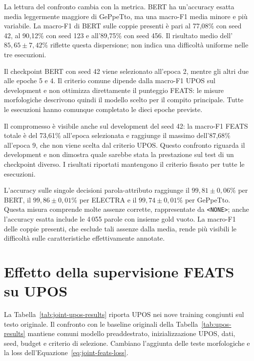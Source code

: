 \documentclass[12pt,a4paper]{report}
\begin{document}
La lettura del confronto cambia con la metrica. BERT ha un'accuracy esatta media leggermente maggiore di GePpeTto, ma una macro-F1 media minore e più variabile. La macro-F1 di BERT sulle coppie presenti è pari al 77,08\% con seed 42, al 90,12\% con seed 123 e all'89,75\% con seed 456. Il risultato medio dell'$85{,}65\pm7{,}42\%$ riflette questa dispersione; non indica una difficoltà uniforme nelle tre esecuzioni.

Il checkpoint BERT con seed 42 viene selezionato all'epoca 2, mentre gli altri due alle epoche 5 e 4. Il criterio comune dipende dalla macro-F1 UPOS sul development e non ottimizza direttamente il punteggio FEATS: le misure morfologiche descrivono quindi il modello scelto per il compito principale. Tutte le esecuzioni hanno comunque completato le dieci epoche previste.

Il compromesso è visibile anche sul development del seed 42: la macro-F1 FEATS totale è del 73,61\% all'epoca selezionata e raggiunge il massimo dell'87,68\% all'epoca 9, che non viene scelta dal criterio UPOS. Questo confronto riguarda il development e non dimostra quale sarebbe stata la prestazione sul test di un checkpoint diverso. I risultati riportati mantengono il criterio fissato per tutte le esecuzioni.

L'accuracy sulle singole decisioni parola-attributo raggiunge il $99{,}81\pm0{,}06\%$ per BERT, il $99{,}86\pm0{,}01\%$ per ELECTRA e il $99{,}74\pm0{,}01\%$ per GePpeTto. Questa misura comprende molte assenze corrette, rappresentate da \texttt{<NONE>}; anche l'accuracy esatta include le 4\,055 parole con insieme gold vuoto. La macro-F1 delle coppie presenti, che esclude tali assenze dalla media, rende più visibili le difficoltà sulle caratteristiche effettivamente annotate.

\section{Effetto della supervisione FEATS su UPOS}
\label{sec:feats-upos-ablation}
La Tabella~\ref{tab:joint-upos-results} riporta UPOS nei nove training congiunti sul testo originale. Il confronto con le baseline originali della Tabella~\ref{tab:upos-results} mantiene comuni modello preaddestrato, inizializzazione UPOS, dati, seed, budget e criterio di selezione. Cambiano l'aggiunta delle teste morfologiche e la loss dell'Equazione~\ref{eq:joint-feats-loss}.
\end{document}
